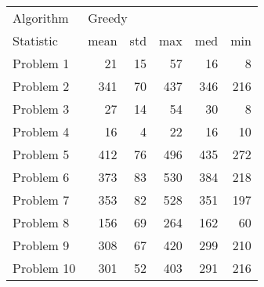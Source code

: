 \begin{tabular}{lrrrrr}
\toprule
Algorithm & \multicolumn{5}{l}{Greedy} \\
Statistic &   mean & std &  max &  med &  min \\
\midrule
Problem 1  &     21 &  15 &   57 &   16 &    8 \\
Problem 2  &    341 &  70 &  437 &  346 &  216 \\
Problem 3  &     27 &  14 &   54 &   30 &    8 \\
Problem 4  &     16 &   4 &   22 &   16 &   10 \\
Problem 5  &    412 &  76 &  496 &  435 &  272 \\
Problem 6  &    373 &  83 &  530 &  384 &  218 \\
Problem 7  &    353 &  82 &  528 &  351 &  197 \\
Problem 8  &    156 &  69 &  264 &  162 &   60 \\
Problem 9  &    308 &  67 &  420 &  299 &  210 \\
Problem 10 &    301 &  52 &  403 &  291 &  216 \\
\bottomrule
\end{tabular}
